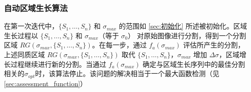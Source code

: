 \subsubsection{自动区域生长算法}

在第一次迭代中，$\{S_1,\dots,S_n\}$ 和 $\sigma_{max}$ 的范围如 \cref{sec:初始化} 所述被初始化。区域生长过程以 $\{S_1,\dots,S_n\}$ 和 $\sigma_{max}$（等于 $\sigma_0$） 对原始图像进行分割，得到一个分割区域 $RG(\sigma_{max},\{S_1,\dots,S_n\})$。在每一步，通过 $f_{a}(\sigma_{max})$ 评估所产生的分割，上述同质区域 $RG(\sigma_{max},\{S_1,\dots,S_n\})$ 取代 $\{S_1,\dots,S_n\}$，$\sigma_{max}$ 增加 $\Delta\sigma$，区域增长过程继续进行新的分割。当通过 $f_{a}(\sigma_{max})$ 确定与区域生长序列中的最佳分割相关的$\sigma_{opt}$时，该算法停止。该问题的解决相当于一个最大函数检测（见 \cref{sec:assessment_function}）